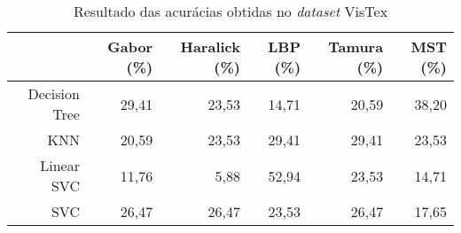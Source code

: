 \begin{table}[H]
    \centering
    \caption[Resultado das acurácias obtidas no VisTex]{Resultado das acurácias obtidas no \textit{dataset} VisTex
    \label{tab:visTexAcuracias}}
    \begin{tabular}{rrrrrr}
        \toprule
            & Gabor (\%) & Haralick (\%) & LBP (\%) & Tamura (\%) & MST (\%) \\
        \midrule
            Decision Tree & 29,41 & 23,53 & 14,71 & 20,59 & 38,20 \\
            KNN & 20,59 & 23,53 & 29,41 & 29,41 & 23,53 \\
            Linear SVC & 11,76 & 5,88 & 52,94 & 23,53 & 14,71 \\
            SVC & 26,47 & 26,47 & 23,53 & 26,47 & 17,65 \\
        \bottomrule
    \end{tabular}
\end{table}
